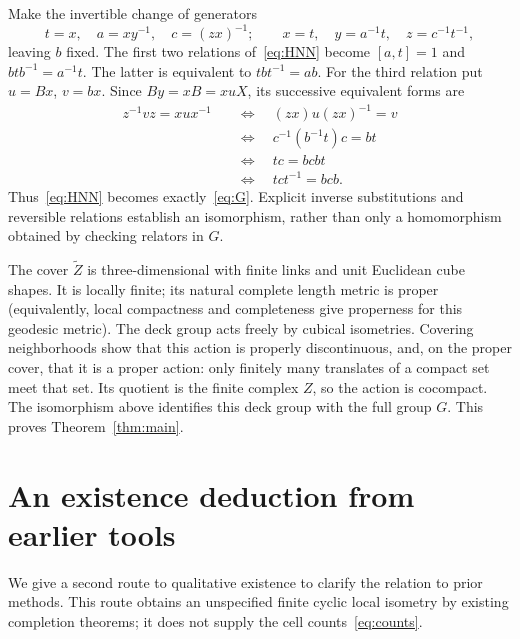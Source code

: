 \documentclass[11pt]{article}
\begin{document}
Make the invertible change of generators
\begin{equation}\label{eq:basis}
 t=x,\quad a=xy^{-1},\quad c=(zx)^{-1};
 \qquad x=t,\quad y=a^{-1}t,\quad z=c^{-1}t^{-1},
\end{equation}
leaving $b$ fixed. The first two relations of~\eqref{eq:HNN} become
$[a,t]=1$ and $btb^{-1}=a^{-1}t$. The latter is equivalent to
$tbt^{-1}=ab$. For the third relation put $u=Bx$, $v=bx$. Since
$By=xB=xuX$, its successive equivalent forms are
\begin{align*}
 z^{-1}vz=xux^{-1}
 &\quad\Longleftrightarrow\quad (zx)u(zx)^{-1}=v\\
 &\quad\Longleftrightarrow\quad c^{-1}(b^{-1}t)c=bt\\
 &\quad\Longleftrightarrow\quad tc=bcbt\\
 &\quad\Longleftrightarrow\quad tct^{-1}=bcb.
\end{align*}
Thus~\eqref{eq:HNN} becomes exactly~\eqref{eq:G}. Explicit inverse
substitutions and reversible relations establish an isomorphism, rather
than only a homomorphism obtained by checking relators in $G$.

The cover $\widetilde Z$ is three-dimensional with finite links and unit
Euclidean cube shapes. It is locally finite; its natural complete length
metric is proper (equivalently, local compactness and completeness give
properness for this geodesic metric). The deck group acts freely by
cubical isometries. Covering neighborhoods show that this action is
properly discontinuous, and, on the proper cover, that it is a proper
action: only finitely many translates of a compact set meet that set.
Its quotient is the finite complex $Z$, so the action is cocompact.
The isomorphism above identifies this deck group with the full group $G$.
This proves Theorem~\ref{thm:main}.

\section{An existence deduction from earlier tools}\label{sec:older}

We give a second route to qualitative existence to clarify the relation
to prior methods. This route obtains an unspecified finite cyclic local
isometry by existing completion theorems; it does not supply the cell
counts~\eqref{eq:counts}.
\end{document}
